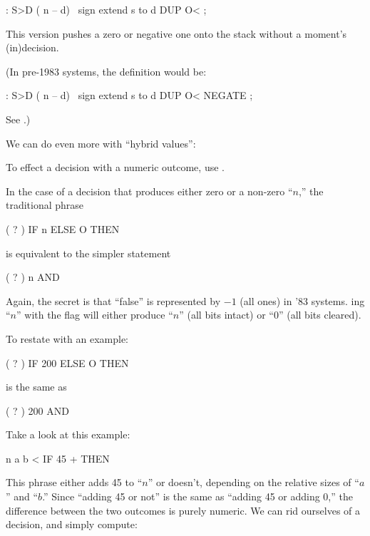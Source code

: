 \begin{Code}
: S>D  ( n -- d)  \ sign extend s to d
     DUP  O< ;
\end{Code}
This version pushes a zero or negative one onto the stack without a
moment's (in)decision.

\medbreak
(In pre-1983 systems, the definition would be:

\begin{Code}
: S>D  ( n -- d)  \ sign extend s to d
     DUP  O< NEGATE ;
\end{Code}
See .)%

%
We can do even more with ``hybrid values'':
%
\begin{tip}
To effect a decision with a numeric outcome, use .
\end{tip}
In the case of a decision that produces either zero or a non-zero ``$n$,'' the
traditional phrase

\begin{Code}
( ? ) IF  n  ELSE  O  THEN
\end{Code}
is equivalent to the simpler statement

\begin{Code}
( ? )  n AND
\end{Code}
Again, the secret is that ``false'' is represented by $-1$ (all ones) in '83
\Forth{} systems. ing ``$n$'' with the flag will either produce ``$n$'' (all
bits intact) or ``0'' (all bits cleared).

To restate with an example:

\begin{Code}
( ? )  IF  200  ELSE  O  THEN
\end{Code}
is the same as

\begin{Code}
( ? )  200 AND
\end{Code}
Take a look at this example:

\begin{Code}
n  a b <  IF  45 +  THEN
\end{Code}
This phrase either adds 45 to ``$n$'' or doesn't, depending on the relative
sizes of ``$a$'' and ``$b$.'' Since ``adding 45 or not'' is the same as ``adding 45
or adding 0,'' the difference between the two outcomes is purely numeric.
We can rid ourselves of a decision, and simply compute:

